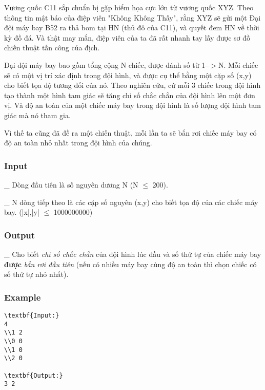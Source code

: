 



   Vương quốc C11 sắp chuẩn bị gặp hiểm họa cực lớn từ vương quốc XYZ. Theo thông tin mật báo của điệp viên "Không Không Thấy", rằng XYZ sẽ gửi một Đại đội máy bay B52 ra thả bom tại HN (thủ đô của C11), và quyết đem HN về thời kỳ đồ đá. Và thật may mắn, điệp viên của ta đã rất nhanh tay lấy được sơ đồ chiến thuật tấn công của địch.  

   Đại đội máy bay bao gồm tổng cộng N chiếc, được đánh số từ 1--$>$N. Mỗi chiếc sẽ có một vị trí xác định trong đội hình, và được cụ thể bằng một cặp số (x,y) cho biết tọa độ tương đối của nó. Theo nghiên cứu, cứ mỗi 3 chiếc trong đội hình tạo thành một hình tam giác sẽ tăng chỉ số chắc chắn của đội hình lên một đơn vị. Và độ an toàn của một chiếc máy bay trong đội hình là số lượng đội hình tam giác mà nó tham gia.  

   Vì thế ta cũng đã đề ra một chiến thuật, mỗi lần ta sẽ bắn rơi chiếc máy bay có độ an toàn nhỏ nhất trong đội hình của chúng.  

\subsubsection{   Input  }

   \_ Dòng đầu tiên là số nguyên dương N (N $\le$ 200).  

   \_ N dòng tiếp theo là các cặp số nguyên (x,y) cho biết tọa độ của các chiếc máy bay. (|x|,|y| $\le$ 1000000000)  

\subsubsection{   Output  }

   \_ Cho biết   \emph{    chỉ số chắc chắn   }   của đội hình lúc đầu và số thứ tự của chiếc máy bay   \textbf{    được   }\emph{    bắn rơi đầu tiên   }   (nếu có nhiều máy bay cùng độ an toàn thì chọn chiếc có số thứ tự nhỏ nhất).  

\subsubsection{   Example  }
\begin{verbatim}
\textbf{Input:}
4
\\1 2
\\0 0 
\\1 0
\\2 0

\textbf{Output:}
3 2
\end{verbatim}
